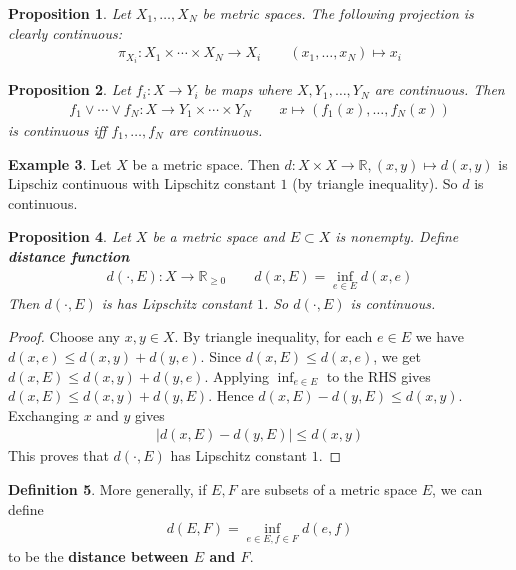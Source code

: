 \documentclass[12pt,b5paper,notitlepage]{article}
\theoremstyle{definition}
\newtheorem{df}{Definition}[section]
\newtheorem{eg}[df]{Example}
\theoremstyle{plain}
\newtheorem{pp}[df]{Proposition}
\newcommand{\Rbb}{\mathbb R}
\numberwithin{equation}{section}
\begin{document}
\begin{pp}
Let $X_1,\dots,X_N$ be metric spaces. The following  projection is clearly continuous:
\begin{gather*}
\pi_{X_i}:X_1\times\cdots\times X_N\rightarrow X_i\qquad(x_1,\dots,x_N)\mapsto x_i
\end{gather*}
\end{pp}

\begin{pp}
Let $f_i:X\rightarrow Y_i$ be maps where $X,Y_1,\dots,Y_N$ are continuous. Then 
\begin{gather*}
f_1\vee \cdots\vee f_N:X\rightarrow Y_1\times\cdots\times Y_N\qquad x\mapsto (f_1(x),\dots,f_N(x))
\end{gather*}
is continuous iff $f_1,\dots,f_N$ are continuous.
\end{pp}


\begin{eg}
Let $X$ be a metric space. Then $d:X\times X\rightarrow\Rbb,(x,y)\mapsto d(x,y)$ is Lipschiz continuous with Lipschitz constant $1$ (by triangle inequality). So $d$ is continuous.
\end{eg}

\begin{pp}\label{lb42}
Let $X$ be a metric space and $E\subset X$ is nonempty. Define \textbf{distance function}   
\begin{gather*}
d(\cdot,E):X\rightarrow\Rbb_{\geq0}\qquad
d(x,E)=\inf_{e\in E}d(x,e)
\end{gather*}
Then $d(\cdot,E)$ is has Lipschitz constant $1$. So $d(\cdot,E)$ is continuous.
\end{pp}


\begin{proof}
Choose any $x,y\in X$. By triangle inequality, for each $e\in E$ we have $d(x,e)\leq d(x,y)+d(y,e)$. Since $d(x,E)\leq d(x,e)$, we get  $d(x,E)\leq d(x,y)+d(y,e)$. Applying $\inf_{e\in E}$ to the RHS gives $d(x,E)\leq d(x,y)+d(y,E)$. Hence $d(x,E)-d(y,E)\leq d(x,y)$. Exchanging $x$ and $y$ gives
\begin{align}
\big|d(x,E)-d(y,E)\big|\leq d(x,y)
\end{align}
This proves that $d(\cdot,E)$ has Lipschitz constant $1$.
\end{proof}

\begin{df}
More generally, if $E,F$ are subsets of a metric space $E$, we can define 
\begin{align}
d(E,F)=\inf_{e\in E,f\in F}d(e,f)
\end{align}
to be the \textbf{distance between $E$ and $F$}.
\end{df}
\end{document}
